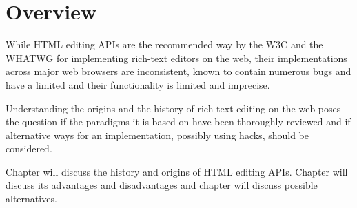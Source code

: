 \chapter{Overview}





While HTML editing APIs are the recommended way by the W3C and the WHATWG for implementing rich-text editors on the web, their implementations across major web browsers are inconsistent, known to contain numerous bugs and have a limited and their functionality is limited and imprecise.

Understanding the origins and the history of rich-text editing on the web poses the question if the paradigms it is based on have been thoroughly reviewed and if alternative ways for an implementation, possibly using hacks, should be considered.




Chapter  will discuss the history and origins of HTML editing APIs. Chapter  will discuss its advantages and disadvantages and
chapter  will discuss possible alternatives.






